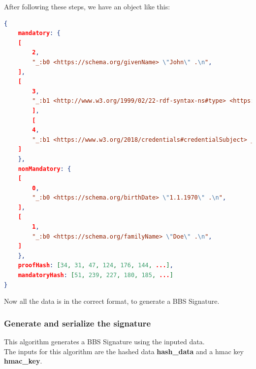 \documentclass[
	a4paper               %
	,BCOR=0mm            %
	,bibliography=totoc   %
	,listof=totoc         %
	,monolingual
	,twoside=false
]{bfhthesis}              %
\begin{document}
After following these steps, we have an object like this:
\begin{lstlisting}[language=json,firstnumber=1,caption={Return object of the VC transformation},captionpos=b]
{
	mandatory: {
	[
		2,
		"_:b0 <https://schema.org/givenName> \"John\" .\n",
	],
	[
		3,
		"_:b1 <http://www.w3.org/1999/02/22-rdf-syntax-ns#type> <https://www.w3.org/2018/credentials#VerifiableCredential> .\n",
		],
		[
		4,
		"_:b1 <https://www.w3.org/2018/credentials#credentialSubject> _:b0 .\n",
	]
	},
	nonMandatory: {
	[
		0,
		"_:b0 <https://schema.org/birthDate> \"1.1.1970\" .\n",
	],
	[
		1,
		"_:b0 <https://schema.org/familyName> \"Doe\" .\n",
	]
	},
	proofHash: [34, 31, 47, 124, 176, 144, ...],
	mandatoryHash: [51, 239, 227, 180, 185, ...]
}
\end{lstlisting}

Now all the data is in the correct format, to generate a BBS Signature.

\subsubsection{Generate and serialize the signature}
\label{subsec:signvc}
This algorithm generates a BBS Signature using the inputed data.\\

The inputs for this algorithm are the hashed data \textbf{hash\_data} and a hmac key \textbf{hmac\_key}.\\
\end{document}
